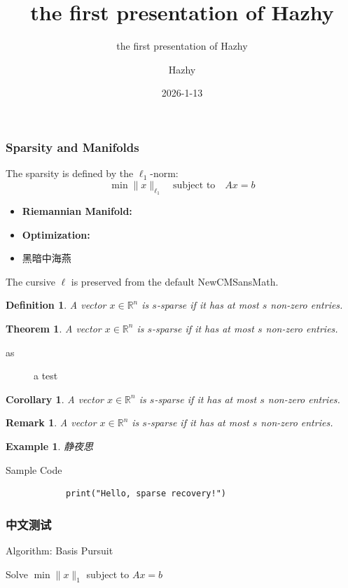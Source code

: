 \documentclass{ltx-talk}
\title{the first presentation of Hazhy}
\subtitle{the first presentation of Hazhy}
\author{Hazhy}
\institute{None}
\date{2026-1-13}
\newtheorem{definition}{\color{myblue}Definition}
\newtheorem{theorem}{\color{myblue}Theorem}
\newtheorem{corollary}{\color{myblue}Corollary}
\newtheorem{remark}{\color{myblue}Remark}
\newtheorem{example}{\color{myblue}Example}
\begin{document}
	\maketitle
	
	\begin{frame} 
		\frametitle{Sparsity and Manifolds}
		The sparsity is defined by the $\ell_1$-norm:
		\[ \min \|x\|_{\ell_1} \quad \text{subject to} \quad Ax = b \]
		
		\begin{itemize}
			\item \textbf{Riemannian Manifold:} 
			\item \textbf{Optimization:} 
			\item  黑暗中海燕
		\end{itemize}
		
		The cursive $\ell$ is preserved from the default NewCMSansMath.
	\end{frame}
	\begin{frame}
		
		\begin{definition}
			A vector $x \in \mathbb{R}^n$ is $s$-sparse if it has at most $s$ non-zero entries.
		\end{definition}
		\begin{theorem}
			A vector $x \in \mathbb{R}^n$ is $s$-sparse if it has at most $s$ non-zero entries.
		\end{theorem}
		\begin{description}
			\item[as]  a test
		\end{description}
		\begin{corollary}
			A vector $x \in \mathbb{R}^n$ is $s$-sparse if it has at most $s$ non-zero entries.
		\end{corollary}
		\begin{remark}
			A vector $x \in \mathbb{R}^n$ is $s$-sparse if it has at most $s$ non-zero entries.
		\end{remark}
		\begin{example}
			静夜思
		\end{example}
	\end{frame}
	
	
	\begin{frame*}{Sample Code}
		
		\begin{verbatim}
			print("Hello, sparse recovery!")
		\end{verbatim}
		
		
	\end{frame*}
	
	
	
	\begin{frame}
		\frametitle{中文测试}
		
	\end{frame}
	
	\begin{frame}{Algorithm: Basis Pursuit}
		\begin{algorithm}[H]
			\caption{L1-Minimization}
			Solve $\min \|x\|_1$ subject to $Ax = b$\;
		\end{algorithm}
	\end{frame}
	
\end{document}

